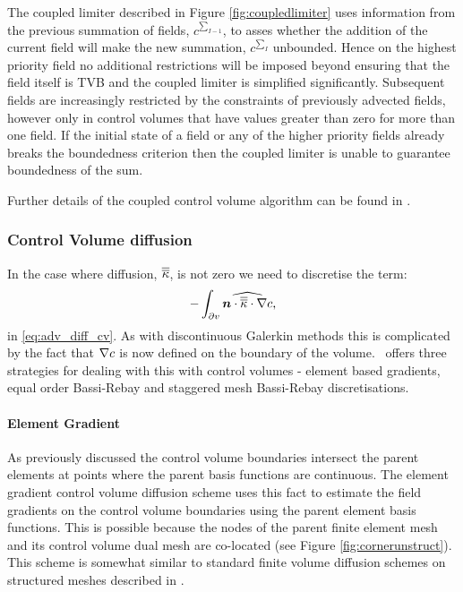 The coupled limiter described in Figure \ref{fig:coupledlimiter} uses information from the previous summation of fields, $c^{\sum_{I-1}}$, to asses whether the addition of the current field will make the new summation, $c^{\sum_I}$ unbounded.  Hence on the highest priority field no additional restrictions will be imposed beyond ensuring that the field itself is TVB and the coupled limiter is simplified significantly.  Subsequent fields are increasingly restricted by the constraints of previously advected fields, however only in control volumes that have values greater than zero for more than one field.  If the initial state of a field or any of the higher priority fields already breaks the boundedness criterion then the coupled limiter is unable to guarantee boundedness of the sum.

Further details of the coupled control volume algorithm can be found in \citet{wilson_phdthesis_2009}.

\subsubsection{Control Volume diffusion}

In the case where diffusion, $\overline{\overline{\kappa}}$, is not zero we need to discretise the term:
\begin{equation}
-\int_{\partial v}\widehat{{\mbox{\boldmath$n$}}\cdot\overline{\overline{\kappa}}\cdot\nabla c},
\end{equation}
in \eqref{eq:adv_diff_cv}.  As with discontinuous Galerkin methods this is complicated by the fact that $\nabla c$ is now defined on the boundary of the volume.  \fluidity\ offers three strategies for dealing with this with control volumes - element based gradients, equal order Bassi-Rebay and staggered mesh Bassi-Rebay discretisations.

\paragraph{Element Gradient} \label{sec:cvegdiff}

As previously discussed the control volume boundaries intersect the parent elements at points where the parent basis functions are continuous.  The element gradient control volume diffusion scheme uses this fact to estimate the field gradients on the control volume boundaries using the parent element basis functions.  This is possible because the nodes of the parent finite element mesh and its control volume dual mesh are co-located (see Figure \ref{fig:cornerunstruct}).  This scheme is somewhat similar to standard finite volume diffusion schemes on structured meshes described in \citet{ciarlet_handbook_2000}.

